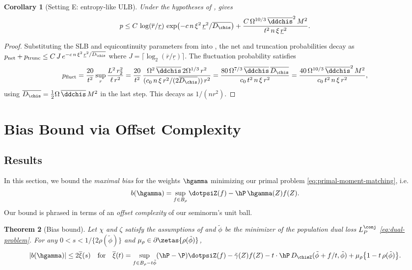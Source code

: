 \documentclass{article}
\newtheorem{theorem}{Theorem}[section]
\newtheorem{corollary}[theorem]{Corollary}
\newcommand{\theoremvariant}[1]{%
  \setcounter{theorem}{\numexpr\variantbase-1\relax}%
  \renewcommand{\thetheorem}{\thesection.\variantbase\textup{#1}}%
}
\newcommand{\resettheorem}{%
  \renewcommand{\thetheorem}{\thesection.\arabic{theorem}}%
}
\begin{document}
\theoremvariant{E}
\begin{corollary}[Setting E: entropy-like ULB]
\label{cor:ulb-entropy-ball}
Under the hypotheses of ,
 gives
\[
p \le C\, \log(\overline{r}/\underline{r})\,
  \exp\!\qty(-c\, n\, \xi^2\,
    \underline{r}^2/\overline{D_{\chis}})
  + \frac{C\, \Omega^{10/3}\,
    \overline{\ddchis}^2\, M^2}
    {t^2\, n\, \xi\, \underline{r}^2}.
\]
\end{corollary}
\begin{proof}
Substituting the SLB and equicontinuity parameters
from 
into ,
the net and truncation probabilities decay as
$p_{\textup{net}} + p_{\textup{trunc}}
  \le C\, J\, e^{-c\, n\, \xi^2\, \underline{r}^2/\overline{D_{\chis}}}$
where $J = \lceil\log_2(\overline{r}/\underline{r})\rceil$.
The fluctuation probability satisfies
\[
p_{\textup{fluct}}
  = \frac{20}{t^2}
    \sup_r \frac{L^2\, r_2^2}{\ell\, r^2}
  = \frac{20}{t^2}\,
    \frac{\Omega^2\, \overline{\ddchis}\,
      2\Omega^{1/3}\, r^2}
    {(c_0\, n\, \xi\, r^2 / (2\overline{D_{\chis}}))\, r^2}
  = \frac{80\,\Omega^{7/3}\,
    \overline{\ddchis}\, \overline{D_{\chis}}}
    {c_0\, t^2\, n\, \xi\, r^2}
  = \frac{40\,\Omega^{10/3}\,
    \overline{\ddchis}^2\, M^2}
    {c_0\, t^2\, n\, \xi\, r^2},
\]
using $\overline{D_{\chis}} = \frac{1}{2}\Omega\,\overline{\ddchis}\,M^2$
in the last step.
This decays as $1/(n r^2)$.
\end{proof}
\resettheorem

\section{Bias Bound via Offset Complexity}
\label{sec:bias-bound}

\subsection{Results}
\label{sec:offset-vs-local}

In this section, we bound the \emph{maximal bias} for the weights $\hgamma$ minimizing our primal problem
\eqref{eq:primal-moment-matching}, i.e.
\[
b(\hgamma) = \sup_{f \in B_\rho}  \dotpsiZ(f) - \hP\, \hgamma(Z) f(Z).
\]
Our bound is phrased in terms of an \emph{offset complexity} of our seminorm's unit ball.

\begin{theorem}[Bias bound]
\label{thm:bias-decomp-restate}
Let $\chi$ and $\zeta$ satisfy the assumptions of  and $\tilde\phi$
be the minimizer of the population dual loss $L_P^\conj$ \eqref{eq:dual-problem}.  For
any $0 < s < 1/\{2\rho(\tilde\phi)\}$ and $\mu_\rho \in \partial\zetas\{\rho(\tilde\phi)\}$,
\[
\qty|b(\hgamma)| \le 2\overline\xi(s) \qfor \overline\xi(t) = \sup_{f \in B_\rho - t\tilde\phi} (\hP - \P)\dotpsiZ(f) - \tilde\gamma(Z) f(Z) - t \cdot \hP\, D_{\chisZ}(\tilde\phi + f/t, \tilde\phi) + \mu_\rho\qty{1 - t\,\rho(\tilde\phi)}.
\]
\end{theorem}
\end{document}
